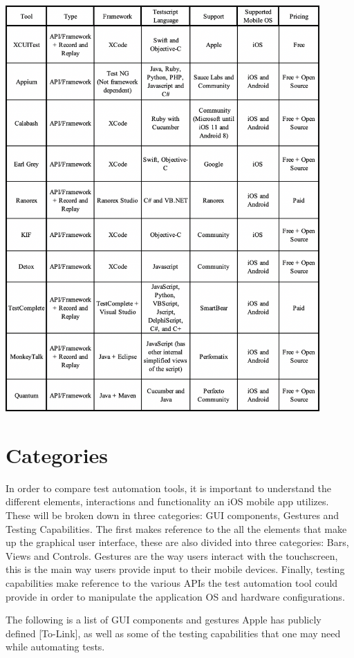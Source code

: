 \includegraphics[width=12cm]{img/table1.png} \\[2mm]

\section{Categories}
In order to compare test automation tools, it is important to understand the different elements, interactions and functionality an iOS mobile app utilizes. These will be broken down in three categories: GUI components, Gestures and Testing Capabilities. The first makes reference to the all the elements that make up the graphical user interface, these are also divided into three categories: Bars, Views and Controls. Gestures are the way users interact with the touchscreen, this is the main way users provide input to their mobile devices. Finally, testing capabilities make reference to the various APIs the test automation tool could provide in order to manipulate the application OS and hardware configurations.

The following is a list of GUI components and gestures Apple has publicly defined [To-Link], as well as some of the testing capabilities that one may need while automating tests. 

